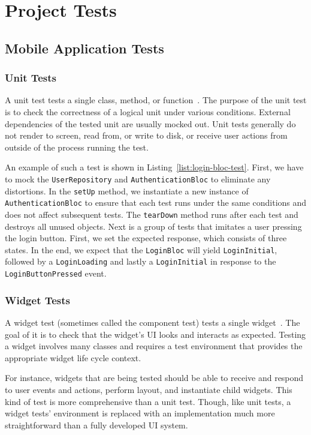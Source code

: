 \chapter{Project Tests}
\section{Mobile Application Tests}
\subsection{Unit Tests}
A unit test tests a single class, method, or function~\cite{testing-flutter}. The purpose of the unit test is to check the correctness of a logical unit under various conditions. External dependencies of the tested unit are usually mocked out. Unit tests generally do not render to screen, read from, or write to disk, or receive user actions from outside of the process running the test.

An example of such a test is shown in Listing~\ref{list:login-bloc-test}. First, we have to mock the \texttt{UserRepository} and \texttt{AuthenticationBloc} to eliminate any distortions. In the \texttt{setUp} method, we instantiate a new instance of \texttt{AuthenticationBloc} to ensure that each test runs under the same conditions and does not affect subsequent tests. The \texttt{tearDown} method runs after each test and destroys all unused objects. Next is a group of tests that imitates a user pressing the login button. First, we set the expected response, which consists of three states. In the end, we expect that the \texttt{LoginBloc} will yield \texttt{LoginInitial}, followed by a \texttt{LoginLoading} and lastly a \texttt{LoginInitial} in response to the \texttt{LoginButtonPressed} event.



\subsection{Widget Tests}
A widget test (sometimes called the component test) tests a single widget~\cite{testing-flutter}. The goal of it is to check that the widget's UI looks and interacts as expected. Testing a widget involves many classes and requires a test environment that provides the appropriate widget life cycle context.

For instance, widgets that are being tested should be able to receive and respond to user events and actions, perform layout, and instantiate child widgets. This kind of test is more comprehensive than a unit test. Though, like unit tests, a widget tests' environment is replaced with an implementation much more straightforward than a fully developed UI system.

